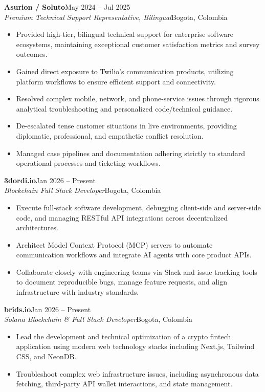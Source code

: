 \documentclass[10pt,letterpaper]{article}
\newcommand{\role}[4]{%
  \textbf{\color{ink}#1}\hfill{\color{muted}\small #2}\\
  {\itshape #3}\hfill{\color{muted}\small #4}
}
\begin{document}
\role{Asurion / Soluto}{May 2024 -- Jul 2025}{Premium Technical Support Representative, Bilingual}{Bogota, Colombia}
\begin{itemize}
  \item Provided high-tier, bilingual technical support for enterprise software ecosystems, maintaining exceptional customer satisfaction metrics and survey outcomes.
  \item Gained direct exposure to Twilio's communication products, utilizing platform workflows to ensure efficient support and connectivity.
  \item Resolved complex mobile, network, and phone-service issues through rigorous analytical troubleshooting and personalized code/technical guidance.
  \item De-escalated tense customer situations in live environments, providing diplomatic, professional, and empathetic conflict resolution.
  \item Managed case pipelines and documentation adhering strictly to standard operational processes and ticketing workflows.
\end{itemize}

\role{3dordi.io}{Jan 2026 -- Present}{Blockchain Full Stack Developer}{Bogota, Colombia}
\begin{itemize}
  \item Execute full-stack software development, debugging client-side and server-side code, and managing RESTful API integrations across decentralized architectures.
  \item Architect Model Context Protocol (MCP) servers to automate communication workflows and integrate AI agents with core product APIs.
  \item Collaborate closely with engineering teams via Slack and issue tracking tools to document reproducible bugs, manage feature requests, and align infrastructure with industry standards.
\end{itemize}

\role{brids.io}{Jan 2026 -- Present}{Solana Blockchain \& Full Stack Developer}{Bogota, Colombia}
\begin{itemize}
  \item Lead the development and technical optimization of a crypto fintech application using modern web technology stacks including Next.js, Tailwind CSS, and NeonDB.
  \item Troubleshoot complex web infrastructure issues, including asynchronous data fetching, third-party API wallet interactions, and state management.
\end{itemize}
\end{document}
